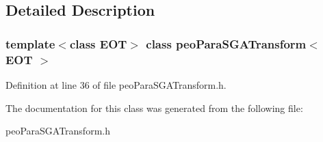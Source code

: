 \subsection{Detailed Description}
\subsubsection*{template$<$class EOT$>$ class peo\-Para\-SGATransform$<$ EOT $>$}





Definition at line 36 of file peo\-Para\-SGATransform.h.

The documentation for this class was generated from the following file:\begin{CompactItemize}
\item 
peo\-Para\-SGATransform.h\end{CompactItemize}
